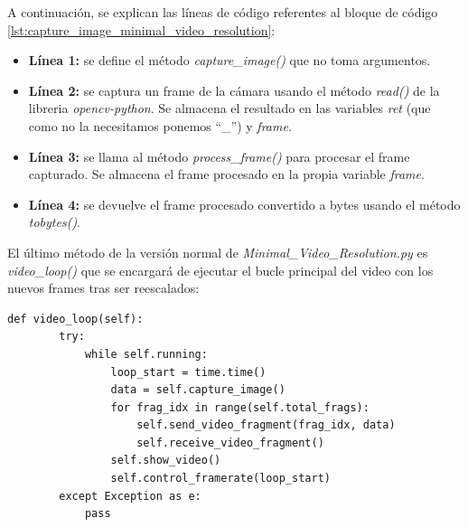 A continuación, se explican las líneas de código referentes al bloque de código \ref{lst:capture_image_minimal_video_resolution}:
\begin{itemize}
    \item \textbf{Línea 1:} se define el método \textit{capture\_image()} que no toma argumentos.
    \item \textbf{Línea 2:} se captura un frame de la cámara usando el método \textit{read()} de la libreria \textit{opencv-python}. Se almacena el resultado en las variables \textit{ret} (que como no la necesitamos ponemos ``\_'') y \textit{frame}.
    \item \textbf{Línea 3:} se llama al método \textit{process\_frame()} para procesar el frame capturado. Se almacena el frame procesado en la propia variable \textit{frame}.
    \item \textbf{Línea 4:} se devuelve el frame procesado convertido a bytes usando el método \textit{tobytes()}.
\end{itemize}
\vspace{\baselineskip}

El último método de la versión normal de \textit{Minimal\_Video\_Resolution.py} es \textit{video\_loop()} que se encargará de ejecutar el bucle principal del video con los nuevos frames tras ser reescalados:
\begin{lstlisting}[style=pythonstyle, caption={Método video\_loop() de \textit{Minimal\_Video\_Resolution}}, label={lst:video_loop_minimal_video_resolution}]
def video_loop(self):
        try:
            while self.running:
                loop_start = time.time()
                data = self.capture_image()
                for frag_idx in range(self.total_frags):
                    self.send_video_fragment(frag_idx, data)
                    self.receive_video_fragment()
                self.show_video()
                self.control_framerate(loop_start)
        except Exception as e:
            pass
\end{lstlisting}
\vspace{\baselineskip}

